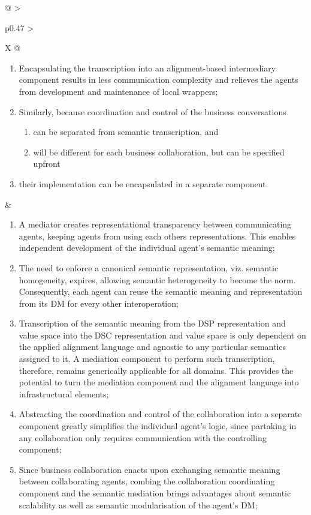 \begin{xltabular}[l]{\linewidth}{@{} >{\small\raggedright\arraybackslash}p{0.47\linewidth} >{\small\raggedright\arraybackslash}X @{}}
\begin{enumerate}[left=6pt, nosep]
  \item Encapsulating the transcription into an alignment-based intermediary component results in less communication complexity and relieves the agents from development and maintenance of local wrappers;
  \item Similarly, because coordination and control of the business conversations
  \begin{enumerate}
    \item can be separated from semantic transcription, and
    \item will be different for each business collaboration, but can be specified upfront 
  \end{enumerate}
  \item their implementation can be encapsulated in a separate component.
\end{enumerate}
&
\begin{enumerate}[left=10pt, nosep]
  \item A mediator creates representational transparency between communicating agents, keeping agents from using each others representations. This enables independent development of the individual agent’s semantic meaning;
  \item The need to enforce a canonical semantic representation, viz. semantic homogeneity, expires, allowing semantic heterogeneity to become the norm. Consequently, each agent can reuse the semantic meaning and representation from its DM for every other interoperation;
  \item Transcription of the semantic meaning from the DSP representation and value space into the DSC representation and value space is only dependent on the applied alignment language and agnostic to any particular semantics assigned to it. A mediation component to perform such transcription, therefore, remains generically applicable for all domains. This provides the potential to turn the mediation component and the alignment language into infrastructural elements;
  \item Abstracting the coordination and control of the collaboration into a separate component greatly simplifies the individual agent's logic, since partaking in any collaboration only requires communication with the controlling component;
  \item Since business collaboration enacts upon exchanging semantic meaning between collaborating agents, combing the collaboration coordinating component and the semantic mediation brings advantages about semantic scalability as well as semantic modularisation of the agent's DM;

\end{enumerate}
\end{xltabular}
